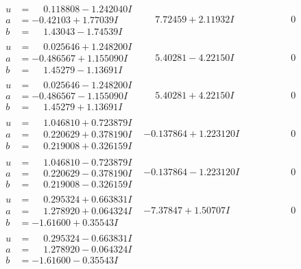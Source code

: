 \documentclass[1p]{elsarticle_modified}
\theoremstyle{definition}
\begin{document}
$$\begin{array}{c|c|c}
\begin{aligned}
u &= \phantom{-}0.118808 - 1.242040 I \\
a &= -0.42103 + 1.77039 I \\
b &= \phantom{-}1.43043 - 1.74539 I\end{aligned}
 & \phantom{-}7.72459 + 2.11932 I & \phantom{-0.000000 } 0 \\ \hline\begin{aligned}
u &= \phantom{-}0.025646 + 1.248200 I \\
a &= -0.486567 + 1.155090 I \\
b &= \phantom{-}1.45279 - 1.13691 I\end{aligned}
 & \phantom{-}5.40281 - 4.22150 I & \phantom{-0.000000 } 0 \\ \hline\begin{aligned}
u &= \phantom{-}0.025646 - 1.248200 I \\
a &= -0.486567 - 1.155090 I \\
b &= \phantom{-}1.45279 + 1.13691 I\end{aligned}
 & \phantom{-}5.40281 + 4.22150 I & \phantom{-0.000000 } 0 \\ \hline\begin{aligned}
u &= \phantom{-}1.046810 + 0.723879 I \\
a &= \phantom{-}0.220629 + 0.378190 I \\
b &= \phantom{-}0.219008 + 0.326159 I\end{aligned}
 & -0.137864 + 1.223120 I & \phantom{-0.000000 } 0 \\ \hline\begin{aligned}
u &= \phantom{-}1.046810 - 0.723879 I \\
a &= \phantom{-}0.220629 - 0.378190 I \\
b &= \phantom{-}0.219008 - 0.326159 I\end{aligned}
 & -0.137864 - 1.223120 I & \phantom{-0.000000 } 0 \\ \hline\begin{aligned}
u &= \phantom{-}0.295324 + 0.663831 I \\
a &= \phantom{-}1.278920 + 0.064324 I \\
b &= -1.61600 + 0.35543 I\end{aligned}
 & -7.37847 + 1.50707 I & \phantom{-0.000000 } 0 \\ \hline\begin{aligned}
u &= \phantom{-}0.295324 - 0.663831 I \\
a &= \phantom{-}1.278920 - 0.064324 I \\
b &= -1.61600 - 0.35543 I\end{aligned}

\end{array}$$
\end{document}
